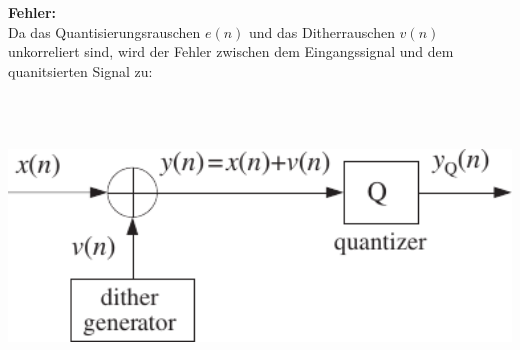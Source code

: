 	\begin{minipage}{0.55\textwidth}
		\textbf{Fehler:}\\[0.1cm]
		Da das Quantisierungsrauschen $e(n)$ und das Ditherrauschen $v(n)$ unkorreliert sind, wird der Fehler zwischen dem Eingangssignal und dem quanitsierten Signal zu:\\[0.2cm]
		\\[0.2cm]
	\end{minipage}\begin{minipage}{0.05\textwidth}$ $\end{minipage}
	\begin{minipage}{0.4\textwidth}
		\includegraphics[width = 1\textwidth]{pic/ditherAdd.pdf}\\[0.2cm]
	\end{minipage}
	
